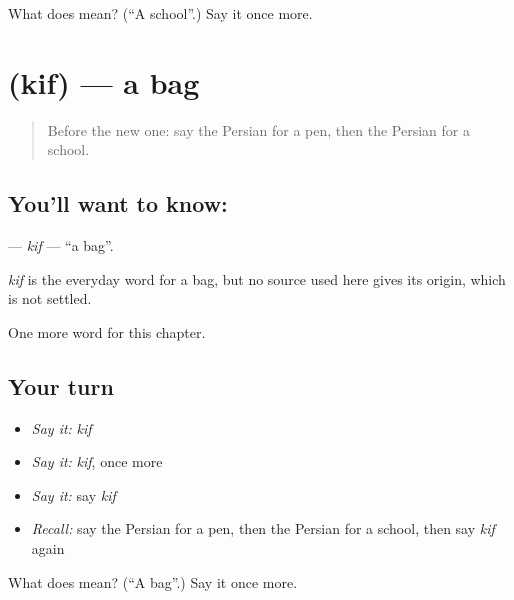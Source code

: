 \begin{tcolorbox}[breakable,colback=teal!4,colframe=teal!35!black,title={Before you move on}]
What does  mean? (\textquotedblleft{}A school\textquotedblright{}.) Say it once more.
\end{tcolorbox}
\section[\texorpdfstring{\fa{کیف} (kif)}{کیف (kif)}]{ (kif) — a bag}

\label{lesson:FA-C49-kif}



\begin{quote}
Before the new one: say the Persian for a pen, then the Persian for a school.
\end{quote}

\subsection*{You'll want to know: }
\textbf{} — \emph{kif} — \textquotedblleft{}a bag\textquotedblright{}.

\begin{cousinweb}
\emph{kif} is the everyday word for a bag, but no source used here gives its origin, which is not settled.
\end{cousinweb}

\begin{grammarlens}[title={What you've built}]
One more word for this chapter.
\end{grammarlens}

\subsection*{Your turn}
\begin{itemize}
\raggedright
  \item \emph{Say it:} \emph{kif}
  \item \emph{Say it:} \emph{kif}, once more
  \item \emph{Say it:} say \emph{kif}
  \item \emph{Recall:} say the Persian for a pen, then the Persian for a school, then say \emph{kif} again
\end{itemize}

\begin{tcolorbox}[breakable,colback=teal!4,colframe=teal!35!black,title={Before you move on}]
What does  mean? (\textquotedblleft{}A bag\textquotedblright{}.) Say it once more.
\end{tcolorbox}
